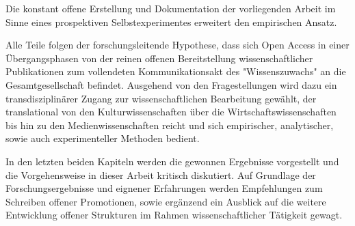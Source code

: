 Die konstant offene Erstellung und Dokumentation der vorliegenden Arbeit im Sinne eines prospektiven Selbstexperimentes erweitert den empirischen Ansatz.

Alle Teile folgen der forschungsleitende Hypothese, dass sich Open Access in einer Übergangsphasen von der reinen offenen Bereitstellung wissenschaftlicher Publikationen zum vollendeten Kommunikationsakt des "Wissenszuwachs" \cite{Luhmann1998} an die Gesamtgesellschaft befindet. Ausgehend von den Fragestellungen wird dazu ein transdisziplinärer Zugang zur wissenschaftlichen Bearbeitung gewählt, der translational von den Kulturwissenschaften über die Wirtschaftswissenschaften bis hin zu den Medienwissenschaften reicht und sich empirischer, analytischer, sowie auch experimenteller Methoden bedient.

In den letzten beiden Kapiteln werden die gewonnen Ergebnisse vorgestellt und die Vorgehensweise in dieser Arbeit kritisch diskutiert. Auf Grundlage der Forschungsergebnisse und eignener Erfahrungen werden Empfehlungen zum Schreiben offener Promotionen, sowie ergänzend ein Ausblick auf die weitere Entwicklung offener Strukturen im Rahmen wissenschaftlicher Tätigkeit gewagt.
